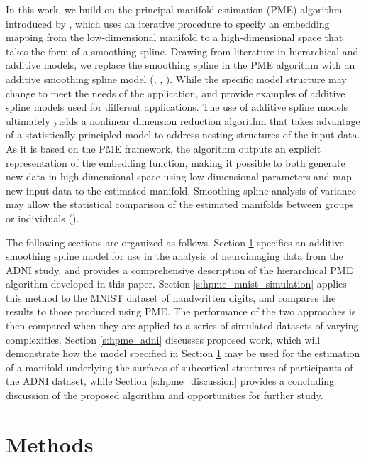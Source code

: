 \documentclass[11pt,reqno]{article}
\theoremstyle{definition}
\begin{document}
In this work, we build on the principal manifold estimation (PME) algorithm introduced by \cite{mengPrincipalManifoldEstimation2021}, which uses an iterative procedure to specify an embedding mapping from the low-dimensional manifold to a high-dimensional space that takes the form of a smoothing spline. Drawing from literature in hierarchical and additive models, we replace the smoothing spline in the PME algorithm with an additive smoothing spline model (\cite{gelmanDataAnalysisUsing2007}, \cite{hastieGeneralizedAdditiveModels1990}, \cite{gelmanBayesianDataAnalysis2014}). While the specific model structure may change to meet the needs of the application, \cite{brumbackSmoothingSplineModels1998} and \cite{schulamFrameworkIndividualizingPredictions2015a} provide examples of additive spline models used for different applications. The use of additive spline models ultimately yields a nonlinear dimension reduction algorithm that takes advantage of a statistically principled model to address nesting structures of the input data. As it is based on the PME framework, the algorithm outputs an explicit representation of the embedding function, making it possible to both generate new data in high-dimensional space using low-dimensional parameters and map new input data to the estimated manifold. Smoothing spline analysis of variance may allow the statistical comparison of the estimated manifolds between groups or individuals (\cite{wangMixedEffectsSmoothing1998}).

The following sections are organized as follows. Section \ref{s:methods} specifies an additive smoothing spline model for use in the analysis of neuroimaging data from the ADNI study, and provides a comprehensive description of the hierarchical PME algorithm developed in this paper. Section \ref{s:hpme_mnist_simulation} applies this method to the MNIST dataset of handwritten digits, and compares the results to those produced using PME. The performance of the two approaches is then compared when they are applied to a series of simulated datasets of varying complexities. Section \ref{s:hpme_adni} discusses proposed work, which will demonstrate how the model specified in Section \ref{s:methods} may be used for the estimation of a manifold underlying the surfaces of subcortical structures of participants of the ADNI dataset, while Section \ref{s:hpme_discussion} provides a concluding discussion of the proposed algorithm and opportunities for further study.

\section{Methods}\label{s:methods}
\end{document}
